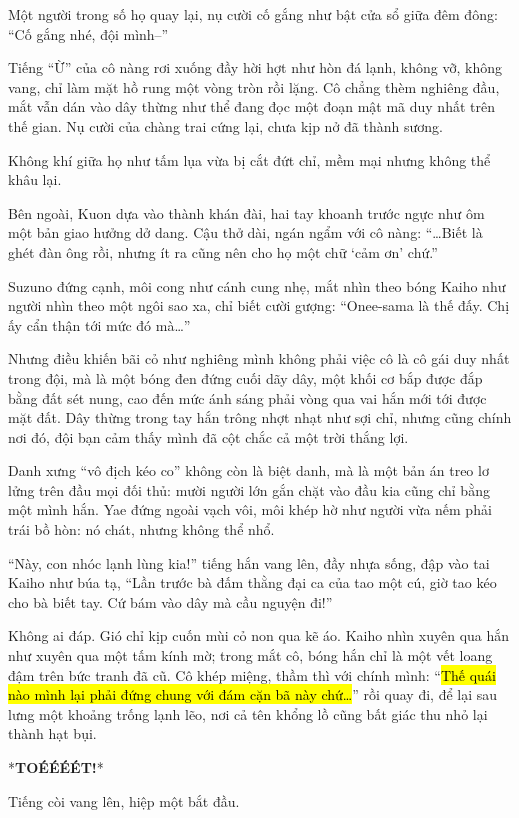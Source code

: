 \documentclass[../main.tex]{subfiles}
\begin{document}
Một người trong số họ quay lại, nụ cười cố gắng như bật cửa sổ giữa đêm đông: ``Cố gắng nhé, đội mình--''

Tiếng ``Ừ'' của cô nàng rơi xuống đầy hời hợt như hòn đá lạnh, không vỡ, không vang, chỉ làm mặt hồ rung một vòng tròn rồi lặng. Cô chẳng thèm nghiêng đầu, mắt vẫn dán vào dây thừng như thể đang đọc một đoạn mật mã duy nhất trên thế gian. Nụ cười của chàng trai cứng lại, chưa kịp nở đã thành sương.

Không khí giữa họ như tấm lụa vừa bị cắt đứt chỉ, mềm mại nhưng không thể khâu lại.

Bên ngoài, Kuon dựa vào thành khán đài, hai tay khoanh trước ngực như ôm một bản giao hưởng dở dang. Cậu thở dài, ngán ngẩm với cô nàng: ``\dots Biết là ghét đàn ông rồi, nhưng ít ra cũng nên cho họ một chữ `cảm ơn' chứ.''

Suzuno đứng cạnh, môi cong như cánh cung nhẹ, mắt nhìn theo bóng Kaiho như người nhìn theo một ngôi sao xa, chỉ biết cười gượng: ``Onee-sama là thế đấy. Chị ấy cẩn thận tới mức đó mà\dots''

Nhưng điều khiến bãi cỏ như nghiêng mình không phải việc cô là cô gái duy nhất trong đội, mà là một bóng đen đứng cuối dãy dây, một khối cơ bắp được đắp bằng đất sét nung, cao đến mức ánh sáng phải vòng qua vai hắn mới tới được mặt đất. Dây thừng trong tay hắn trông nhợt nhạt như sợi chỉ, nhưng cũng chính nơi đó, đội bạn cảm thấy mình đã cột chắc cả một trời thắng lợi.

Danh xưng ``vô địch kéo co'' không còn là biệt danh, mà là một bản án treo lơ lửng trên đầu mọi đối thủ: mười người lớn gắn chặt vào đầu kia cũng chỉ bằng một mình hắn. Yae đứng ngoài vạch vôi, môi khép hờ như người vừa nếm phải trái bồ hòn: nó chát, nhưng không thể nhổ.

``Này, con nhóc lạnh lùng kia!'' tiếng hắn vang lên, đầy nhựa sống, đập vào tai Kaiho như búa tạ, ``Lần trước bà đấm thằng đại ca của tao một cú, giờ tao kéo cho bà biết tay. Cứ bám vào dây mà cầu nguyện đi!''

Không ai đáp. Gió chỉ kịp cuốn mùi cỏ non qua kẽ áo. Kaiho nhìn xuyên qua hắn như xuyên qua một tấm kính mờ; trong mắt cô, bóng hắn chỉ là một vết loang đậm trên bức tranh đã cũ. Cô khép miệng, thầm thì với chính mình: ``\hl{Thế quái nào mình lại phải đứng chung với đám cặn bã này chứ\dots}'' rồi quay đi, để lại sau lưng một khoảng trống lạnh lẽo, nơi cả tên khổng lồ cũng bất giác thu nhỏ lại thành hạt bụi.

*\textbf{TOÉÉÉÉT!}*

Tiếng còi vang lên, hiệp một bắt đầu.
\end{document}
